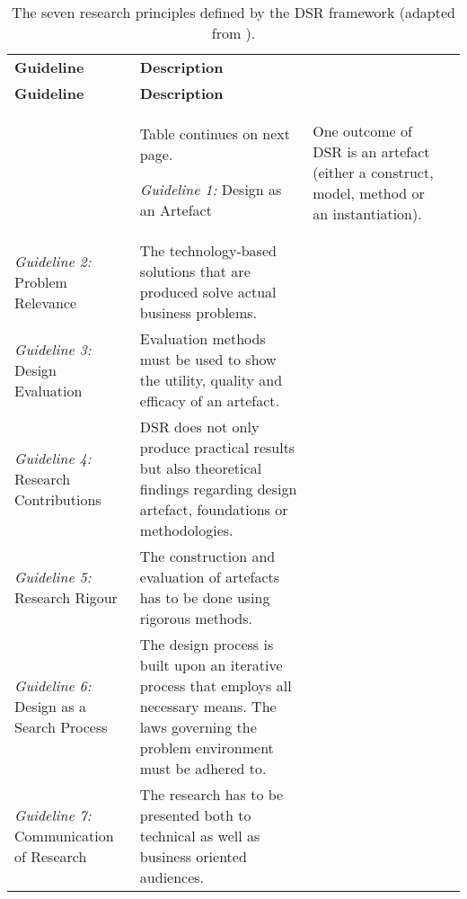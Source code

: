 \begin{longtable}{lXXX}
\label{tab:design_science_guidelines}
\vspace{0.25cm}\\
\toprule
\textbf{Guideline} & \textbf{Description} \\ 
\midrule
\endfirsthead
\toprule
\textbf{Guideline} & \textbf{Description} \\ 
\midrule
\endhead
\midrule
& \hspace*{\fill} \small{Table continues on next page.}
\endfoot
\bottomrule
\caption[The seven research principles defined by the \acs{DSR} framework.]{The seven research principles defined by the \ac{DSR} framework (adapted from \autocite[Tab. 1]{VonAlanDesignscienceinformation2004}).}
\endlastfoot
\textit{Guideline 1:} Design as an Artefact & One outcome of \ac{DSR} is an artefact (either a construct, model, method or an instantiation). \\
\textit{Guideline 2:} Problem Relevance & The technology-based solutions that are produced solve actual business problems. \\
\textit{Guideline 3:} Design Evaluation & Evaluation methods must be used to show the utility, quality and efficacy of an artefact. \\
\textit{Guideline 4:} Research Contributions & \ac{DSR} does not only produce practical results but also theoretical findings regarding design artefact, foundations or methodologies. \\
\textit{Guideline 5:} Research Rigour & The construction and evaluation of artefacts has to be done using rigorous methods. \\
\textit{Guideline 6:} Design as a Search Process & The design process is built upon an iterative process that employs all necessary means. The laws governing the problem environment must be adhered to.\\
\textit{Guideline 7:} Communication of Research & The research has to be presented both to technical as well as business oriented audiences. \\
\end{longtable}
